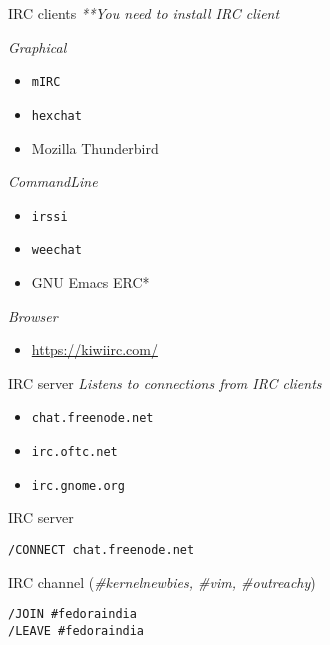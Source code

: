 \documentclass[10pt]{beamer}
\begin{document}
\begin{frame}[fragile,label={sec:org8369179}]{IRC clients}
 \emph{**You need to install IRC client}

\begin{block}{\emph{Graphical}}
\begin{itemize}
\item \texttt{mIRC}
\item \texttt{hexchat}
\item Mozilla Thunderbird
\end{itemize}
\end{block}

\begin{block}{\emph{CommandLine}}
\begin{itemize}
\item \texttt{irssi}
\item \texttt{weechat}
\item GNU Emacs ERC*
\end{itemize}
\end{block}

\begin{block}{\emph{Browser}}
\begin{itemize}
\item \url{https://kiwiirc.com/}
\end{itemize}
\end{block}
\end{frame}

\begin{frame}[fragile,label={sec:org6938838}]{IRC server}
 \emph{Listens to connections from IRC clients}


\begin{itemize}
\item \texttt{chat.freenode.net}
\item \texttt{irc.oftc.net}
\item \texttt{irc.gnome.org}
\end{itemize}
\end{frame}

\begin{frame}[fragile,label={sec:org02ac8c1}]{IRC server}
 \begin{verbatim}
/CONNECT chat.freenode.net
\end{verbatim}
\end{frame}


\begin{frame}[fragile,label={sec:org721ef16}]{IRC channel}
 (\emph{\#kernelnewbies, \#vim, \#outreachy})


\begin{verbatim}
/JOIN #fedoraindia
/LEAVE #fedoraindia
\end{verbatim}
\end{frame}
\end{document}
